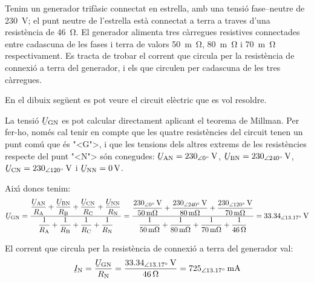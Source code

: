 \begin{exemple}
    Tenim un generador trif\`{a}sic connectat en estrella, amb una tensi\'{o} fase--neutre de \SI{230}{V}; el punt neutre de l'estrella est\`{a} connectat a terra a traves d'una resist\`{e}ncia de \SI{46}{\ohm}. El generador alimenta tres c\`{a}rregues resistives connectades entre cadascuna de les fases i terra de valors \SI{50}{m\ohm}, \SI{80}{m\ohm} i \SI{70}{m\ohm} respectivament. Es tracta de trobar el corrent que circula per la resist\`{e}ncia de connexi\'{o} a terra del generador, i els que circulen per cadascuna de les tres c\`{a}rregues.

    En el dibuix seg\"{u}ent es pot veure el circuit el\`{e}ctric que es vol resoldre.

    \begin{center}
        
    \end{center}

    La tensi\'{o} $\cmplx{U}\ped{GN}$ es pot calcular directament aplicant el teorema de Millman. Per fer-ho, nom\'{e}s cal tenir en compte que les quatre resist\`{e}ncies del circuit tenen un punt com\'{u} que \'{e}s {"<}G{">}, i que les tensions dels altres extrems de les resist\`{e}ncies respecte del punt {"<}N{">} s\'{o}n conegudes: $\cmplx{U}\ped{AN}=\SIpd{230}{0}{V}$, $\cmplx{U}\ped{BN}=\SIpd{230}{240}{V}$, $\cmplx{U}\ped{CN}=\SIpd{230}{120}{V}$ i  $\cmplx{U}\ped{NN}=\SI{0}{V}$.

    Aix\'{\i} doncs tenim:
    \[
    \cmplx{U}\ped{GN} = \frac{ \dfrac{\cmplx{U}\ped{AN}}{R\ped{A}} + \dfrac{\cmplx{U}\ped{BN}}{R\ped{B}} + \dfrac{\cmplx{U}\ped{CN}}{R\ped{C}} + \dfrac{\cmplx{U}\ped{NN}}{R\ped{N}}} { \dfrac{1}{R\ped{A}} + \dfrac{1}{R\ped{B}} + \dfrac{1}{R\ped{C}} + \dfrac{1}{R\ped{N}} } =
    \frac{\dfrac{\SIpd{230}{0}{V}}{\SI{50}{m\ohm}}+\dfrac{\SIpd{230}{240}{V}}{\SI{80}{m\ohm}}+
    \dfrac{\SIpd{230}{120}{V}}{\SI{70}{m\ohm}}}{\dfrac{1}{\SI{50}{m\ohm}}+\dfrac{1}{\SI{80}{m\ohm}}+
    \dfrac{1}{\SI{70}{m\ohm}}+\dfrac{1}{\SI{46}{\ohm}}} =
    \SIpd{33,34}{13,17}{V}
    \]

    El corrent  que circula per la resist\`{e}ncia de connexi\'{o} a terra del generador val:
    \[
    \cmplx{I}\ped{N} = \frac{\cmplx{U}\ped{GN}}{R\ped{N}} = \frac{\SIpd{33,34}{13,17}{V}}{\SI{46}{\ohm}}
    = \SIpd{725}{13,17}{mA}
    \]


\end{exemple}
